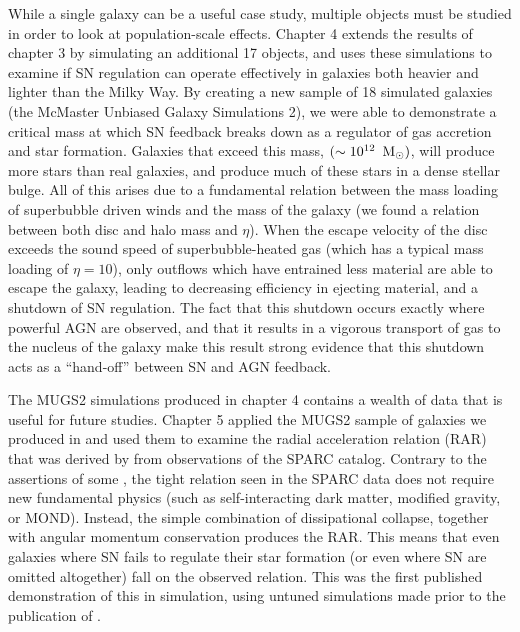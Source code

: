 While a single galaxy can be a useful case study, multiple objects must be
studied in order to look at population-scale effects.  Chapter 4 extends the
results of chapter 3 by simulating an additional 17 objects, and uses these
simulations to examine if SN regulation can operate effectively in galaxies both
heavier and lighter than the Milky Way.  By creating a new sample of 18
simulated galaxies (the McMaster Unbiased Galaxy Simulations 2), we were able to
demonstrate a critical mass at which SN feedback breaks down as a regulator of
gas accretion and star formation.  Galaxies that exceed this mass, $(\sim
10^{12}\;\>{\rm M_{\odot}})$, will produce more stars than real galaxies, and produce much
of these stars in a dense stellar bulge.  All of this arises due to a
fundamental relation between the mass loading of superbubble driven winds and
the mass of the galaxy (we found a relation between both disc and halo mass and
$\eta$).  When the escape velocity of the disc exceeds the sound speed of
superbubble-heated gas (which has a typical mass loading of $\eta=10$), only
outflows which have entrained less material are able to escape the galaxy,
leading to decreasing efficiency in ejecting material, and a shutdown of SN
regulation.  The fact that this shutdown occurs exactly where powerful AGN are
observed, and that it results in a vigorous transport of gas to the nucleus of
the galaxy make this result strong evidence that this shutdown acts as a 
``hand-off'' between SN and AGN feedback.

The MUGS2 simulations produced in chapter 4 contains a wealth of data
that is useful for future studies. Chapter 5 applied the MUGS2 sample of
galaxies we produced in \citet{Keller2016a} and used them to examine the radial
acceleration relation (RAR) that was derived by \citet{McGaugh2016} from
observations of the SPARC \citep{Lelli2016b} catalog.  Contrary to the assertions
of some \citep{Milgrom2016}, the tight relation seen in the SPARC data does not
require new fundamental physics (such as self-interacting dark matter, modified
gravity, or MOND).  Instead, the simple combination of dissipational collapse,
together with angular momentum conservation produces the RAR. This means that
even galaxies where SN fails to regulate their star formation (or even where SN
are omitted altogether) fall on the observed relation.  This was the first
published demonstration of this in simulation, using untuned simulations made
prior to the publication of \citet{McGaugh2016}.

